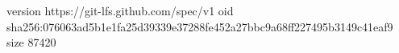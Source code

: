 version https://git-lfs.github.com/spec/v1
oid sha256:076063ad5b1e1fa25d39339e37288fe452a27bbc9a68ff227495b3149c41eaf9
size 87420
